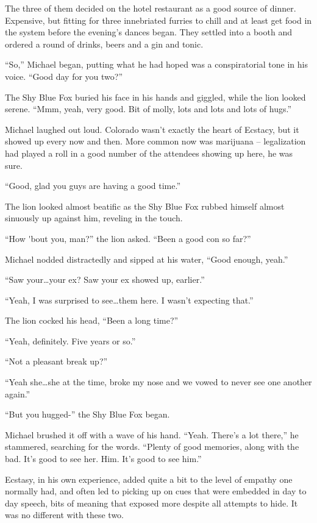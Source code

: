 \documentclass[12pt,letterpaper,oneside]{memoir}
\begin{document}
  The three of them decided on the hotel restaurant as a good source of dinner.  Expensive, but fitting for three innebriated furries to chill and at least get food in the system before the evening's dances began.  They settled into a booth and ordered a round of drinks, beers and a gin and tonic.

  ``So,'' Michael began, putting what he had hoped was a conspiratorial tone in his voice.  ``Good day for you two?''

  The Shy Blue Fox buried his face in his hands and giggled, while the lion looked serene.  ``Mmm, yeah, very good.  Bit of molly, lots and lots and lots of hugs.''

  Michael laughed out loud.  Colorado wasn't exactly the heart of Ecstacy, but it showed up every now and then.  More common now was marijuana -- legalization had played a roll in a good number of the attendees showing up here, he was sure.

  ``Good, glad you guys are having a good time.''

  The lion looked almost beatific as the Shy Blue Fox rubbed himself almost sinuously up against him, reveling in the touch.

  ``How \'{}bout you, man?'' the lion asked.  ``Been a good con so far?''

  Michael nodded distractedly and sipped at his water, ``Good enough, yeah.''

  ``Saw your\ldots{}your ex?  Saw your ex showed up, earlier.''

  ``Yeah, I was surprised to see\ldots{}them here.  I wasn't expecting that.''

  The lion cocked his head, ``Been a long time?''

  ``Yeah, definitely.  Five years or so.''

  ``Not a pleasant break up?''

  ``Yeah she\ldots{}she at the time, broke my nose and we vowed to never see one another again.''

  ``But you hugged-'' the Shy Blue Fox began.

  Michael brushed it off with a wave of his hand.  ``Yeah.  There's a lot there,'' he stammered, searching for the words.  ``Plenty of good memories, along with the bad.  It's good to see her.  Him.  It's good to see him.''

  Ecstasy, in his own experience, added quite a bit to the level of empathy one normally had, and often led to picking up on cues that were embedded in day to day speech, bits of meaning that exposed more despite all attempts to hide.  It was no different with these two.
\end{document}
